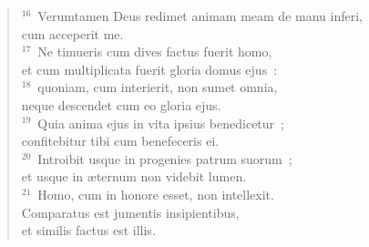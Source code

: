 \begin{verse}
${}^{16}$~Verumtamen Deus redimet animam meam de manu inferi,\\ cum acceperit me.\\
${}^{17}$~Ne timueris cum dives factus fuerit homo,\\ et cum multiplicata fuerit gloria domus ejus~:\\
${}^{18}$~quoniam, cum interierit, non sumet omnia,\\ neque descendet cum eo gloria ejus.\\
${}^{19}$~Quia anima ejus in vita ipsius benedicetur~;\\ confitebitur tibi cum benefeceris ei.\\
${}^{20}$~Introibit usque in progenies patrum suorum~;\\ et usque in \ae ternum non videbit lumen.\\
${}^{21}$~Homo, cum in honore esset, non intellexit.\\ Comparatus est jumentis insipientibus,\\ et similis factus est illis.\end{verse}



